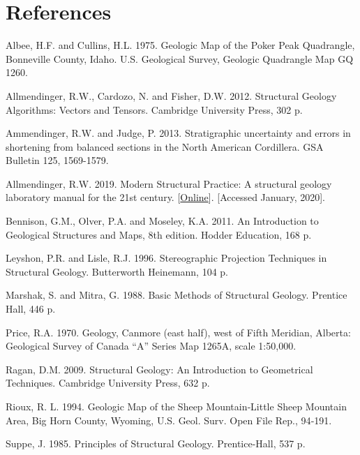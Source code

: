 \documentclass[a4paper , 12pt]{book}
\begin{document}
\section*{References}

Albee, H.F. and Cullins, H.L. 1975. Geologic Map of the Poker Peak Quadrangle, Bonneville County, Idaho. U.S. Geological Survey, Geologic Quadrangle Map GQ 1260. 

Allmendinger, R.W., Cardozo, N. and Fisher, D.W. 2012. Structural Geology Algorithms: Vectors and Tensors. Cambridge University Press, 302 p.

Ammendinger, R.W. and Judge, P. 2013. Stratigraphic uncertainty and errors in shortening from balanced sections in the North American Cordillera. GSA Bulletin 125, 1569-1579.

Allmendinger, R.W. 2019. Modern Structural Practice: A structural geology laboratory manual for the 21st century. [\href{http://www.geo.cornell.edu/geology/faculty/RWA/structure-lab-manual}{Online}]. [Accessed January, 2020].

Bennison, G.M., Olver, P.A. and Moseley, K.A. 2011. An Introduction to Geological Structures and Maps, 8th edition. Hodder Education, 168 p.

Leyshon, P.R. and Lisle, R.J. 1996. Stereographic Projection Techniques in Structural Geology. Butterworth Heinemann, 104 p.

Marshak, S. and Mitra, G. 1988. Basic Methods of Structural Geology. Prentice Hall, 446 p.

Price, R.A. 1970. Geology, Canmore (east half), west of Fifth Meridian, Alberta: Geological Survey of Canada “A” Series Map 1265A, scale 1:50,000.

Ragan, D.M. 2009. Structural Geology: An Introduction to Geometrical Techniques. Cambridge University Press, 632 p.

Rioux, R. L. 1994. Geologic Map of the Sheep Mountain‐Little Sheep Mountain Area, Big Horn County, Wyoming, U.S. Geol. Surv. Open File Rep., 94‐191.

Suppe, J. 1985. Principles of Structural Geology. Prentice-Hall, 537 p.
\end{document}
